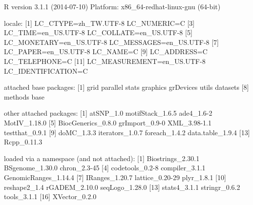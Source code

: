 \documentclass[a4paper,10pt]{article}
\begin{document}
\begin{Schunk}
\begin{Soutput}
R version 3.1.1 (2014-07-10)
Platform: x86_64-redhat-linux-gnu (64-bit)

locale:
 [1] LC_CTYPE=zh_TW.UTF-8       LC_NUMERIC=C              
 [3] LC_TIME=en_US.UTF-8        LC_COLLATE=en_US.UTF-8    
 [5] LC_MONETARY=en_US.UTF-8    LC_MESSAGES=en_US.UTF-8   
 [7] LC_PAPER=en_US.UTF-8       LC_NAME=C                 
 [9] LC_ADDRESS=C               LC_TELEPHONE=C            
[11] LC_MEASUREMENT=en_US.UTF-8 LC_IDENTIFICATION=C       

attached base packages:
[1] grid      parallel  stats     graphics  grDevices utils     datasets 
[8] methods   base     

other attached packages:
 [1] atSNP_1.0          motifStack_1.6.5   ade4_1.6-2         MotIV_1.18.0      
 [5] BiocGenerics_0.8.0 grImport_0.9-0     XML_3.98-1.1       testthat_0.9.1    
 [9] doMC_1.3.3         iterators_1.0.7    foreach_1.4.2      data.table_1.9.4  
[13] Rcpp_0.11.3       

loaded via a namespace (and not attached):
 [1] Biostrings_2.30.1    BSgenome_1.30.0      chron_2.3-45        
 [4] codetools_0.2-8      compiler_3.1.1       GenomicRanges_1.14.4
 [7] IRanges_1.20.7       lattice_0.20-29      plyr_1.8.1          
[10] reshape2_1.4         rGADEM_2.10.0        seqLogo_1.28.0      
[13] stats4_3.1.1         stringr_0.6.2        tools_3.1.1         
[16] XVector_0.2.0       
\end{Soutput}
\end{Schunk}


%


\end{document}
